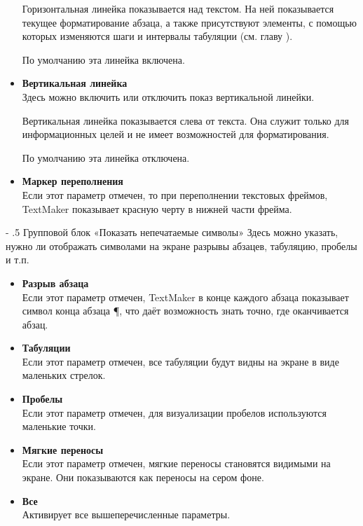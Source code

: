 ﻿\documentclass[a4paper,10pt]{article}
\makeatletter
\renewcommand\paragraph{%
   \@startsection{paragraph}{4}{0mm}%
      {-\baselineskip}%
      {.5\baselineskip}%
      {\normalfont\normalsize\bfseries}}
\makeatother
\begin{document}
\begin{itemize}
  Горизонтальная линейка показывается над текстом. На ней показывается текущее форматирование абзаца, а также присутствуют элементы, с помощью которых изменяются шаги и интервалы табуляции (см. главу ).
  
  По умолчанию эта линейка включена.
  \item \textbf{Вертикальная линейка}\\
  Здесь можно включить или отключить показ вертикальной линейки.
  
  Вертикальная линейка показывается слева от текста. Она служит только для информационных целей и не имеет возможностей для форматирования.
  
  По умолчанию эта линейка отключена.
  \item \textbf{Маркер переполнения}\\
  Если этот параметр отмечен, то при переполнении текстовых фреймов, TextMaker показывает красную черту в нижней части фрейма.
  \end{itemize}
  
  \paragraph{Групповой блок «Показать непечатаемые символы»}
  Здесь можно указать, нужно ли отображать символами на экране разрывы абзацев, табуляцию, пробелы и т.п.
  
  \begin{itemize}
   \item \textbf{Разрыв абзаца}\\
  Если этот параметр отмечен, TextMaker в конце каждого абзаца показывает символ конца абзаца ¶, что даёт возможность знать точно, где оканчивается абзац.
  \item \textbf{Табуляции}\\
  Если этот параметр отмечен, все табуляции будут видны на экране в виде маленьких стрелок.
  \item \textbf{Пробелы}\\
  Если этот параметр отмечен, для визуализации пробелов используются маленькие точки.
  \item \textbf{Мягкие переносы}\\
  Если этот параметр отмечен, мягкие переносы становятся видимыми на экране. Они показываются как переносы на сером фоне.
  \item \textbf{Все}\\
  Активирует все вышеперечисленные параметры.
 \end{itemize} 
 
\end{document}
